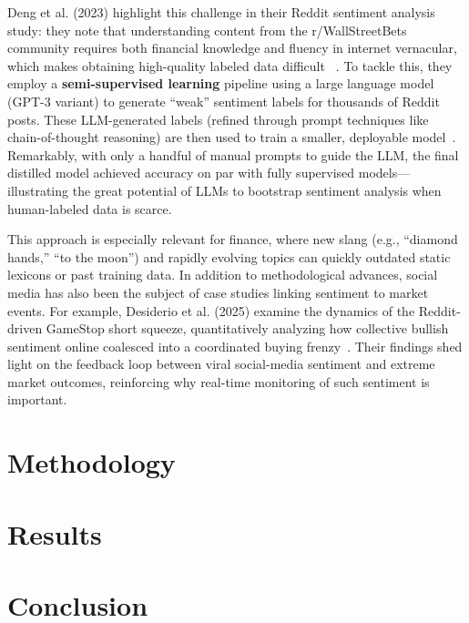 \documentclass[12pt]{article}
\begin{document}
Deng et al. (2023) highlight this challenge in their Reddit sentiment analysis study:
they note that understanding content from the r/WallStreetBets community requires both financial knowledge
and fluency in internet vernacular, which makes obtaining high-quality labeled data difficult~
\cite{10.1145/3543873.3587605}. To tackle this, they employ a \textbf{semi-supervised learning} pipeline
using a large language model (GPT-3 variant) to generate ``weak'' sentiment labels for thousands of Reddit
posts. These LLM-generated labels (refined through prompt techniques like chain-of-thought reasoning) are
then used to train a smaller, deployable model~\cite{10.1145/3543873.3587605}. Remarkably, with only a
handful of manual prompts to guide the LLM, the final distilled model achieved accuracy on par with fully
supervised models---illustrating the great potential of LLMs to bootstrap sentiment analysis when
human-labeled data is scarce.

This approach is especially relevant for finance, where new slang (e.g., ``diamond hands,'' ``to the moon'')
and rapidly evolving topics can quickly outdated static lexicons or past training data. In addition to
methodological advances, social media has also been the subject of case studies linking sentiment to market
events. For example, Desiderio et al. (2025) examine the dynamics of the Reddit-driven GameStop short
squeeze, quantitatively analyzing how collective bullish sentiment online coalesced into a coordinated buying
frenzy~\cite{Desiderio_2025}. Their findings shed light on the feedback loop between viral social-media
sentiment and extreme market outcomes, reinforcing why real-time monitoring of such sentiment is important.

\section{Methodology}

\section{Results}

\section{Conclusion}



\end{document}
